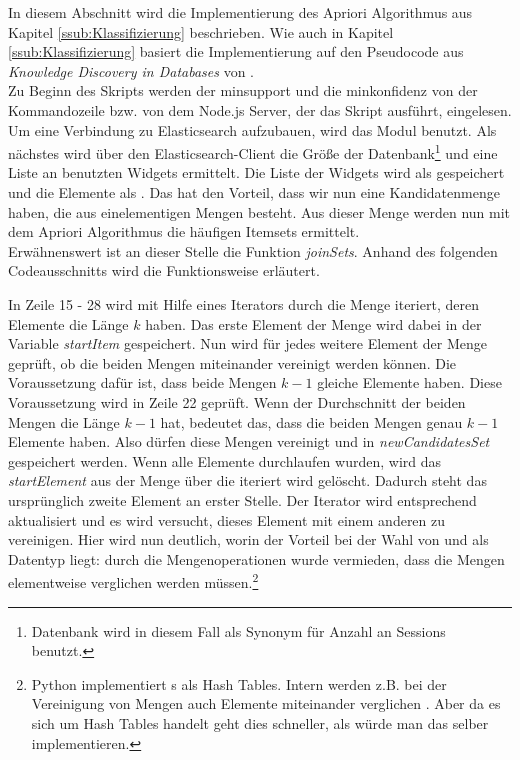 In diesem Abschnitt wird die Implementierung des Apriori Algorithmus aus Kapitel \ref{ssub:Klassifizierung} beschrieben. Wie auch in Kapitel \ref{ssub:Klassifizierung} basiert die Implementierung auf den Pseudocode aus \glqq \textit{Knowledge Discovery in Databases}\grqq{} von \citet{EsSa00}.\\
Zu Beginn des Skripts werden der minsupport und die minkonfidenz von der Kommandozeile bzw. von dem Node.js Server, der das Skript ausführt, eingelesen. Um eine Verbindung zu Elasticsearch aufzubauen, wird das Modul  benutzt. Als nächstes wird über den Elasticsearch-Client die Größe der Datenbank\footnote{Datenbank wird in diesem Fall als Synonym für Anzahl an Sessions benutzt.} und eine Liste an benutzten Widgets ermittelt. Die Liste der Widgets wird als  gespeichert und die Elemente als . Das hat den Vorteil, dass wir nun eine Kandidatenmenge haben, die aus einelementigen Mengen besteht. Aus dieser Menge werden nun mit dem Apriori Algorithmus die häufigen Itemsets ermittelt.\\
Erwähnenswert ist an dieser Stelle die Funktion \textit{joinSets}. Anhand des folgenden Codeausschnitts wird die Funktionsweise erläutert.
\clearpage
\begin{figure}[htb]

\end{figure}
In Zeile 15 - 28 wird mit Hilfe eines Iterators durch die Menge iteriert, deren Elemente die Länge $k$ haben. Das erste Element der Menge wird dabei in der Variable \textit{startItem} gespeichert. Nun wird für jedes weitere Element der Menge geprüft, ob die beiden Mengen miteinander vereinigt werden können. Die Voraussetzung dafür ist, dass beide Mengen $k-1$ gleiche Elemente haben. Diese Voraussetzung wird in Zeile 22 geprüft. Wenn der Durchschnitt der beiden Mengen die Länge $k-1$ hat, bedeutet das, dass die beiden Mengen genau $k-1$ Elemente haben. Also dürfen diese Mengen vereinigt und in \textit{newCandidatesSet} gespeichert werden. Wenn alle Elemente durchlaufen wurden, wird das \textit{startElement} aus der Menge über die iteriert wird gelöscht. Dadurch steht das ursprünglich zweite Element an erster Stelle. Der Iterator wird entsprechend aktualisiert und es wird versucht, dieses Element mit einem anderen zu vereinigen. Hier wird nun deutlich, worin der Vorteil bei der Wahl von  und  als Datentyp liegt: durch die Mengenoperationen wurde vermieden, dass die Mengen elementweise verglichen werden müssen.\footnote{Python implementiert s als Hash Tables. Intern werden z.B. bei der Vereinigung von Mengen auch Elemente miteinander verglichen \citep{GeFoGe20}. Aber da es sich um Hash Tables handelt geht dies schneller, als würde man das selber implementieren.}\\

